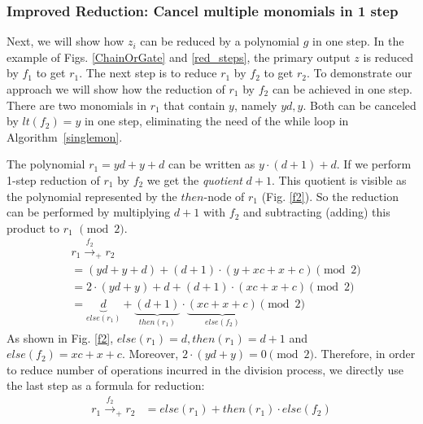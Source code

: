 \subsubsection{Improved Reduction: Cancel multiple monomials in 1 step}
Next, we will show how $z_i$ can be reduced by a polynomial $g$ {in one step}. In the 
example of Figs. \ref{ChainOrGate} and \ref{red_steps}, the primary output
$z$ is reduced by $f_1$ to get $r_1$. The next  step  
is to reduce $r_1$ by $f_2$ to get $r_2$. To demonstrate our
approach we will show how the reduction of $r_1$ by $f_2$ can be
achieved in one step. There are two monomials in $r_1$ that contain
$y$, namely $yd,y$. Both can be canceled by $lt(f_2) = y$ in one step,
eliminating the need of the while loop in Algorithm~\ref{singlemon}.    

The polynomial $r_1 = yd + y + d$ can be written as $y\cdot(d+1) +
d$. If we perform 1-step reduction of $r_1$ by $f_2$ we get 
the {\it quotient} $d+1$. This quotient is visible as the polynomial
represented by the $then$-node of $r_1$ (Fig. \ref{f2}). So the
reduction can be performed by multiplying $d + 1$ with $f_2$ and
subtracting (adding) this  product to $r_1$ $\pmod{2}$.
\begin{align}
& r_1\xrightarrow{f_2}_+ r_2\\
&= (yd + y + d) + (d + 1)\cdot(y + xc + x + c) \pmod{2}\\
&= 2\cdot(yd + y) + d + (d+1)\cdot(xc + x + c) \pmod{2}\label{eqn:cancelmon}\\
&= \underbrace{d}_{else(r_1)} + \underbrace{(d+1)}_{then(r_1)}\cdot\underbrace{(xc + x + c)}_{else(f_2)}  \pmod{2}
\label{eqn:subexp}
\end{align}
As shown in Fig. \ref{f2}, $else(r_1)=d, then(r_1)=d+1$ and
$else(f_2)=xc+x+c$. Moreover, $2\cdot(yd + y) = 0
\pmod{2}$. Therefore, in order to reduce number of operations incurred
in the division process, we directly use the last step as a formula
for reduction:   
\begin{align}
\label{eqn:onestep}
r_1 \xrightarrow{f_2}_+ r_2 %
&= else(r_1) + then(r_1)\cdot else(f_2)
\end{align}

